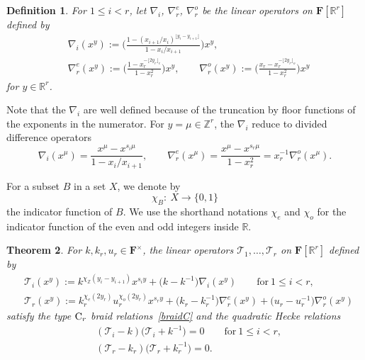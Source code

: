 \documentclass[pdftex]{sigma}
\numberwithin{equation}{section}
\newtheorem{Theorem}{Theorem}[section]
\newtheorem{Definition}[Theorem]{Definition}
\begin{document}
{\begin{Definition}%
For $1\leq i<r$, let $\nabla_i$, $\nabla_r^e$, $\nabla_r^o$ be the linear operators on $\mathbf{F}[\mathbb{R}^r]$ defined by
\begin{align*}
&\nabla_i(x^y):=\biggl(\frac{1-(x_{i+1}/x_i)^{\lfloor y_i-y_{i+1}\rfloor}}{1-x_i/x_{i+1}}\biggr)x^y,\\
&\nabla_r^e(x^y):=\biggl(\frac{1-x_r^{-\lfloor 2y_r\rfloor_e}}{1-x_r^2}\biggr)x^y,\qquad
\nabla_r^o(x^y):=\biggl(\frac{x_r-x_r^{-\lfloor 2y_r\rfloor_o}}{1-x_r^2}\biggr)x^y
\end{align*}
for $y\in\mathbb{R}^r$.
\end{Definition}

Note that the $\nabla_i$ are well defined because of the truncation by floor functions of the exponents in the numerator.
For $y=\mu\in\mathbb{Z}^r$, the $\nabla_i$ reduce to divided difference operators
\begin{equation}\label{nablapol}
\nabla_i(x^\mu)=\frac{x^\mu-x^{s_i\mu}}{1-x_i/x_{i+1}},\qquad \nabla_r^e(x^\mu)=\frac{x^\mu-x^{s_r\mu}}{1-x_r^2}=x_r^{-1}\nabla_r^o(x^\mu).
\end{equation}

For a subset $B$ in a set $X$, we denote by
\[
\chi_B\colon \ X\rightarrow \{0,1\}
\]
the indicator function of $B$.
We use the shorthand notations $\chi_e$ and $\chi_o$ for the indicator function of the even and odd integers inside $\mathbb{R}$.

\begin{Theorem}\label{TheoremA}
For $k,k_r,u_r\in\mathbf{F}^\times$, the linear operators $\mathcal{T}_1,\dots,\mathcal{T}_r$ on $\mathbf{F}[\mathbb{R}^r]$ defined by
\begin{align*}%
&\mathcal{T}_i(x^y):=k^{\chi_{\mathbb{Z}}(y_i-y_{i+1})}x^{s_iy}+\bigl(k-k^{-1}\bigr)\nabla_i(x^y)\qquad \text{for}\ 1\leq i<r,\\
&\mathcal{T}_r(x^y):=k_r^{\chi_e(2y_r)}u_r^{\chi_o(2y_r)}x^{s_ry}+\bigl(k_r-k_r^{-1}\bigr)\nabla_r^e(x^y)+\bigl(u_r-u_r^{-1}\bigr)\nabla_r^o(x^y)
\end{align*}
satisfy the type ${\rm C}_r$ braid relations~\eqref{braidC} and the quadratic Hecke relations
\begin{align*}
&(\mathcal{T}_i-k)\bigl(\mathcal{T}_i+k^{-1}\bigr)=0\qquad\text{for}\ 1\leq i<r,\nonumber\\
&(\mathcal{T}_r-k_r)\bigl(\mathcal{T}_r+k_r^{-1}\bigr)=0.%
\end{align*}
\end{Theorem}

}
\end{document}
